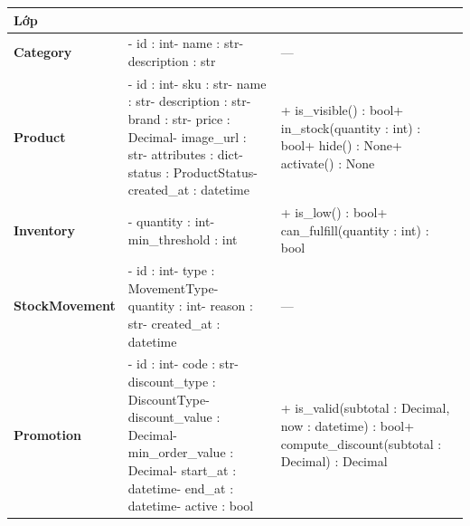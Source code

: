 \documentclass[12pt,a4paper,oneside]{report}
\begin{document}
\begin{longtable}{>{\raggedright\arraybackslash\small\bfseries}p{3.5cm}>{\raggedright\arraybackslash\ttfamily\footnotesize}p{5.1cm}>{\raggedright\arraybackslash\ttfamily\footnotesize}p{6.7cm}}
\toprule
\textbf{Lớp} & \multicolumn{1}{l}{\textbf{Thuộc tính}} & \multicolumn{1}{l}{\textbf{Phương thức}} \\
\midrule
\endhead
\bottomrule
\endlastfoot
Category & - id : int\newline - name : str\newline - description : str & --- \\
\midrule
Product & - id : int\newline - sku : str\newline - name : str\newline - description : str\newline - brand : str\newline - price : Decimal\newline - image\_url : str\newline - attributes : dict\newline - status : ProductStatus\newline - created\_at : datetime & + is\_visible() : bool\newline + in\_stock(quantity : int) : bool\newline + hide() : None\newline + activate() : None \\
\midrule
Inventory & - quantity : int\newline - min\_threshold : int & + is\_low() : bool\newline + can\_fulfill(quantity : int) : bool \\
\midrule
StockMovement & - id : int\newline - type : MovementType\newline - quantity : int\newline - reason : str\newline - created\_at : datetime & --- \\
\midrule
Promotion & - id : int\newline - code : str\newline - discount\_type : DiscountType\newline - discount\_value : Decimal\newline - min\_order\_value : Decimal\newline - start\_at : datetime\newline - end\_at : datetime\newline - active : bool & + is\_valid(subtotal : Decimal, now : datetime) : bool\newline + compute\_discount(subtotal : Decimal) : Decimal \\
\midrule
\end{longtable}
\end{document}
